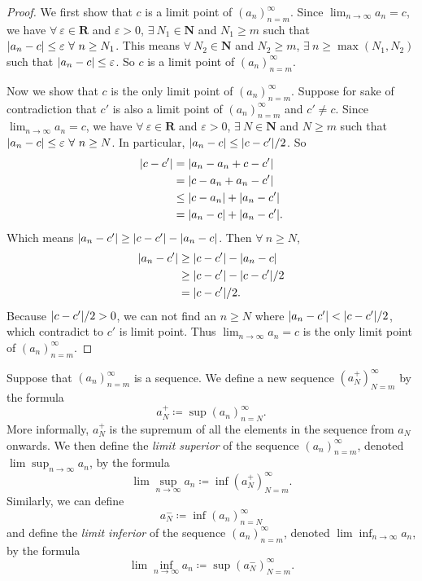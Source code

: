 \begin{proof}
We first show that \(c\) is a limit point of \((a_n)_{n = m}^\infty\).
Since \(\lim_{n \to \infty} a_n = c\), we have \(\forall\ \varepsilon \in \mathbf{R}\) and \(\varepsilon > 0\), \(\exists\ N_1 \in \mathbf{N}\) and \(N_1 \geq m\) such that \(\abs*{a_n - c} \leq \varepsilon \ \forall\ n \geq N_1\).
This means \(\forall\ N_2 \in \mathbf{N}\) and \(N_2 \geq m\), \(\exists\ n \geq \max(N_1, N_2)\) such that \(\abs*{a_n - c} \leq \varepsilon\).
So \(c\) is a limit point of \((a_n)_{n = m}^\infty\).

Now we show that \(c\) is the only limit point of \((a_n)_{n = m}^\infty\).
Suppose for sake of contradiction that \(c'\) is also a limit point of \((a_n)_{n = m}^\infty\) and \(c' \neq c\).
Since \(\lim_{n \to \infty} a_n = c\), we have \(\forall\ \varepsilon \in \mathbf{R}\) and \(\varepsilon > 0\), \(\exists\ N \in \mathbf{N}\) and \(N \geq m\) such that \(\abs*{a_n - c} \leq \varepsilon \ \forall\ n \geq N\).
In particular, \(\abs*{a_n - c} \leq \abs*{c - c'} / 2\).
So
\begin{align*}
\abs*{c - c'} &= \abs*{a_n - a_n + c - c'} \\
&= \abs*{c - a_n + a_n - c'} \\
&\leq \abs*{c - a_n} + \abs*{a_n - c'} \\
&= \abs*{a_n - c} + \abs*{a_n - c'}.
\end{align*}
Which means \(\abs*{a_n - c'} \geq \abs*{c - c'} - \abs*{a_n - c}\).
Then \(\forall\ n \geq N\),
\begin{align*}
\abs*{a_n - c'} &\geq \abs*{c - c'} - \abs*{a_n - c} \\
&\geq \abs*{c - c'} - \abs*{c - c'} / 2 \\
&= \abs*{c - c'} / 2.
\end{align*}
Because \(\abs*{c - c'} / 2 > 0\), we can not find an \(n \geq N\) where \(\abs*{a_n - c'} < \abs*{c - c'} / 2\), which contradict to \(c'\) is limit point.
Thus \(\lim_{n \to \infty} a_n = c\) is the only limit point of \((a_n)_{n = m}^\infty\).
\end{proof}

\begin{definition}\label{6.4.6}
Suppose that \((a_n)_{n = m}^\infty\) is a sequence.
We define a new sequence \((a_N^+)_{N = m}^\infty\) by the formula
\[
    a_N^+ \coloneqq \sup(a_n)_{n = N}^\infty.
\]
More informally, \(a_N^+\) is the supremum of all the elements in the sequence from \(a_N\) onwards.
We then define the \emph{limit superior} of the sequence \((a_n)_{n = m}^\infty\), denoted \(\lim\sup_{n \to \infty} a_n\), by the formula
\[
    \lim\sup_{n \to \infty} a_n \coloneqq \inf(a_N^+)_{N = m}^\infty.
\]
Similarly, we can define
\[
    a_N^- \coloneqq \inf(a_n)_{n = N}^\infty
\]
and define the \emph{limit inferior} of the sequence \((a_n)_{n = m}^\infty\), denoted \(\lim\inf_{n \to \infty} a_n\), by the formula
\[
    \lim\inf_{n \to \infty} a_n \coloneqq \sup(a_N^-)_{N = m}^\infty.
\]
\end{definition}

